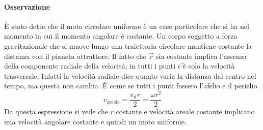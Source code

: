 \documentclass[10pt,a4paper]{book}
\begin{document}
\paragraph{Osservazione} È stato detto che il moto circolare uniforme è un caso particolare che si ha nel momento in cui il momento angolare è costante. Un corpo soggetto a forza gravitazionale che si muove lungo una traiettoria circolare mantiene costante la distanza con il pianeta attrattore. Il fatto che $\vec{r}$ sia costante implica l'assenza della componente radiale della velocità; in tutti i punti c'è solo la velocità trasversale. Infatti la velocità radiale dice quanto varia la distanza dal centro nel tempo, ma questa non cambia. È come se tutti i punti fossero l'afelio e il perielio.
\[
	v_\text{areale}=\frac{v_\vartheta r}{2}=\frac{\omega r^2}{2}
\]
Da questa espressione si vede che $r$ costante e velocità areale costante implicano una velocità angolare costante e quindi un moto uniforme.
\end{document}
